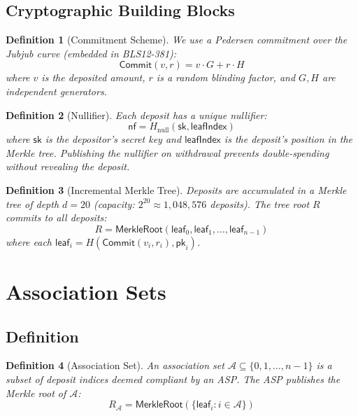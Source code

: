 \documentclass[11pt,a4paper]{article}
\newtheorem{definition}{Definition}
\begin{document}
\subsection{Cryptographic Building Blocks}

\begin{definition}[Commitment Scheme]
We use a Pedersen commitment over the Jubjub curve (embedded in BLS12-381):
\begin{equation}
    \mathsf{Commit}(v, r) = v \cdot G + r \cdot H
\end{equation}
where $v$ is the deposited amount, $r$ is a random blinding factor, and $G, H$ are independent generators.
\end{definition}

\begin{definition}[Nullifier]
Each deposit has a unique nullifier:
\begin{equation}
    \mathsf{nf} = H_{\text{null}}(\mathsf{sk}, \mathsf{leafIndex})
\end{equation}
where $\mathsf{sk}$ is the depositor's secret key and $\mathsf{leafIndex}$ is the deposit's position in the Merkle tree. Publishing the nullifier on withdrawal prevents double-spending without revealing the deposit.
\end{definition}

\begin{definition}[Incremental Merkle Tree]
Deposits are accumulated in a Merkle tree of depth $d = 20$ (capacity: $2^{20} \approx 1{,}048{,}576$ deposits). The tree root $R$ commits to all deposits:
\begin{equation}
    R = \mathsf{MerkleRoot}(\mathsf{leaf}_0, \mathsf{leaf}_1, \ldots, \mathsf{leaf}_{n-1})
\end{equation}
where each $\mathsf{leaf}_i = H(\mathsf{Commit}(v_i, r_i), \mathsf{pk}_i)$.
\end{definition}

\section{Association Sets}\label{sec:association}

\subsection{Definition}

\begin{definition}[Association Set]
An association set $\mathcal{A} \subseteq \{0, 1, \ldots, n-1\}$ is a subset of deposit indices deemed compliant by an ASP. The ASP publishes the Merkle root of $\mathcal{A}$:
\begin{equation}
    R_{\mathcal{A}} = \mathsf{MerkleRoot}(\{\mathsf{leaf}_i : i \in \mathcal{A}\})
\end{equation}
\end{definition}
\end{document}
